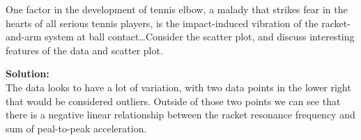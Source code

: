 \documentclass[12pt]{article}
\makeatletter
\theoremstyle{homework}
\newenvironment{exercise}[1]
{\def\@currentlabel{#1}\exercisecore}
{\endexercisecore}
\newcommand{\localhead}[1]{\par\smallskip\noindent\textbf{#1}\nobreak\\}%
\newcommand\solution{\localhead{Solution:}}
\makeatother
\begin{document}
\vspace{.5in}















\begin{exercise}{12.6} One factor in the development of tennis elbow, a malady that strikes fear in the hearts of all serious tennis players,
  is the impact-induced vibration of the racket-and-arm system at ball contact\dots Consider the scatter plot, and discuss interesting features 
  of the data and scatter plot.\\
  \solution 
  The data looks to have a lot of variation, with two data points in the lower right that would be considered outliers. Outside of those two
  points we can see that there is a negative linear relationship between the racket resonance frequency and sum of peal-to-peak acceleration.\\ 
\end{exercise}
\vspace{.5in}
\end{document}
